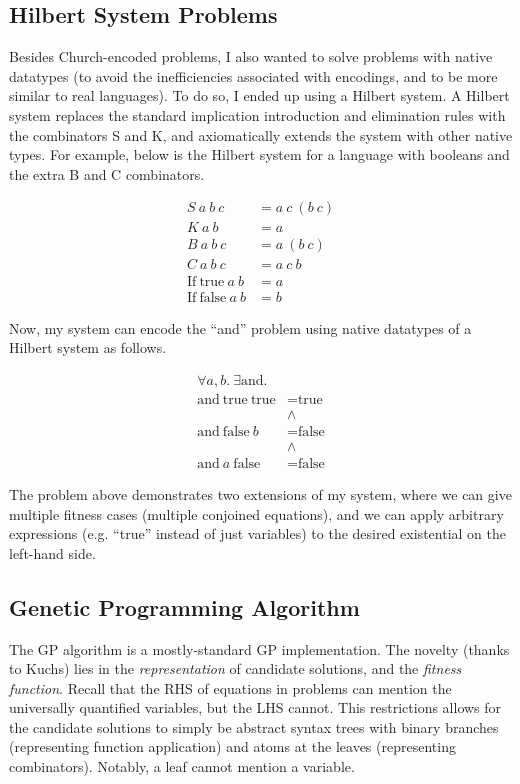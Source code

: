 \documentclass{article}
\newcommand{\n}[1]{\textrm{#1}}
\begin{document}
\subsection{Hilbert System Problems}

Besides Church-encoded problems, I also wanted to solve problems with
native datatypes (to avoid the inefficiencies associated with
encodings, and to be more similar to real languages).
To do so, I ended up using a Hilbert system. A Hilbert system replaces
the standard implication introduction and elimination rules with the
combinators S and K, and axiomatically extends the system with other
native types. For example, below is the Hilbert system for a language
with booleans and the extra B and C combinators.

\begin{align*}
S ~ a ~ b ~ c &= a ~ c ~ (b ~ c)\\
K ~ a ~ b &= a\\
B ~ a ~ b ~ c &= a ~ (b ~ c)\\
C ~ a ~ b ~ c &= a ~ c ~ b\\
\n{If} ~ \n{true} ~ a ~ b &= a\\
\n{If} ~ \n{false} ~ a ~ b &= b
\end{align*}

Now, my system can encode the ``and'' problem using native datatypes of a
Hilbert system as follows.

\begin{align*}
\forall a,b . ~ \exists \n{and} .\\
\n{and} ~ \n{true} ~ \n{true} &= \n{true}\\
&\land\\
\n{and} ~ \n{false} ~ b &= \n{false}\\
&\land\\
\n{and} ~ a ~ \n{false} &= \n{false}
\end{align*}

The problem above demonstrates two extensions of my system, where we
can give multiple fitness cases (multiple conjoined equations), and we can apply
arbitrary expressions (e.g. ``true'' instead of just variables) to the
desired existential on the left-hand side.

\subsection{Genetic Programming Algorithm}

The GP algorithm is a mostly-standard GP implementation. The novelty
(thanks to Kuchs) lies in the \textit{representation} of candidate
solutions, and the \textit{fitness function}. Recall that the RHS of
equations in problems can mention the universally quantified
variables, but the LHS cannot. This restrictions allows for the
candidate solutions to simply be abstract syntax trees with binary
branches (representing function application) and atoms at the leaves
(representing combinators). Notably, a leaf cannot mention a variable.
\end{document}
